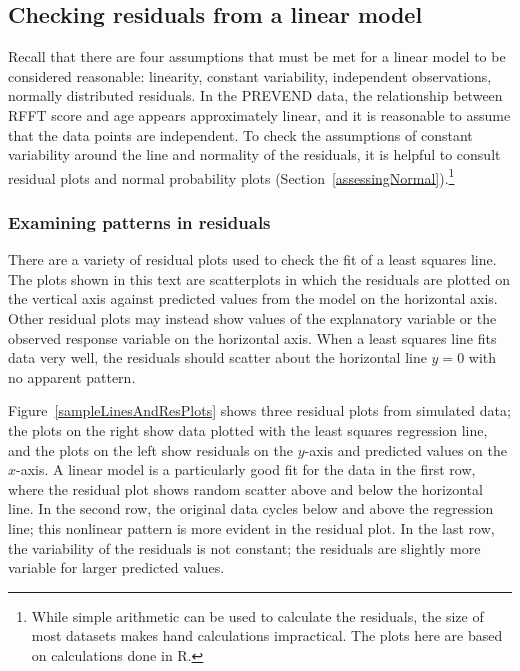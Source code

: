 \subsection{Checking residuals from a linear model}
\label{checkingResiduals}


Recall that there are four assumptions that must be met for a linear model to be considered reasonable: linearity, constant variability, independent observations, normally distributed residuals. In the PREVEND data, the relationship between RFFT score and age appears approximately linear, and it is reasonable to assume that the data points are independent. To check the assumptions of constant variability around the line and normality of the residuals, it is helpful to consult residual plots and normal probability plots (Section~\ref{assessingNormal}).\footnote{While simple arithmetic can be used to calculate the residuals, the size of most datasets makes hand calculations impractical. The plots here are based on calculations done in \textsf{R}.}


\textD{\newpage}


\subsubsection{Examining patterns in residuals}

There are a variety of residual plots used to check the fit of a least squares line. The plots shown in this text are scatterplots in which the residuals are plotted on the vertical axis against predicted values from the model on the horizontal axis. Other residual plots may instead show values of the explanatory variable or the observed response variable on the horizontal axis. When a least squares line fits data very well, the residuals should scatter about the horizontal line $y = 0$ with no apparent pattern.

Figure~\ref{sampleLinesAndResPlots} shows three residual plots from simulated data; the plots on the right show data plotted with the least squares regression line, and the plots on the left show residuals on the $y$-axis and predicted values on the $x$-axis. A linear model is a particularly good fit for the data in the first row, where the residual plot shows random scatter above and below the horizontal line. In the second row, the original data cycles below and above the regression line; this nonlinear pattern is more evident in the residual plot. In the last row, the variability of the residuals is not constant; the residuals are slightly more variable for larger predicted values.

